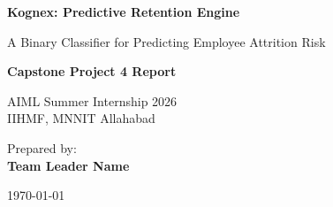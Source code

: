\documentclass[10pt,a4paper,twocolumn]{report}
\begin{document}
\begin{titlepage}
    \begin{center}
        \vspace*{2cm}
        
        \Huge
        \textbf{Kognex: Predictive Retention Engine}
        
        \vspace{0.5cm}
        \LARGE
        A Binary Classifier for Predicting Employee Attrition Risk
        
        \vspace{1.5cm}
        
        \textbf{Capstone Project 4 Report}
        
        \vfill
        
        \Large
        AIML Summer Internship 2026 \\
        IIHMF, MNNIT Allahabad
        
        \vspace{1.5cm}
        
        \Large
        Prepared by: \\
        \textbf{Team Leader Name} \\ %
        
        \vspace{1cm}
        
        \today
        
    \end{center}
\end{titlepage}
\end{document}
